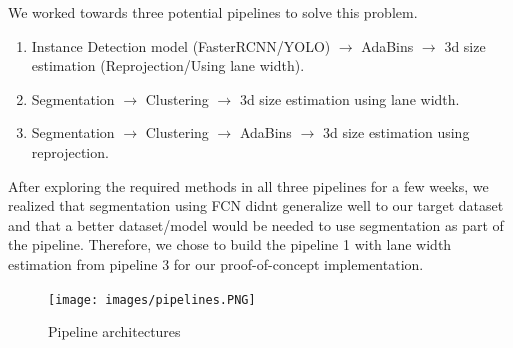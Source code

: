 \documentclass{article}
\begin{document}
We worked towards three potential pipelines to solve this problem.

\begin{enumerate}
    \item Instance Detection model (FasterRCNN/YOLO) $\to$ AdaBins $\to$ 3d size estimation (Reprojection/Using lane width).
    
    \item Segmentation $\to$ Clustering $\to$ 3d size estimation using lane width.
    
    \item Segmentation $\to$ Clustering $\to$ AdaBins $\to$ 3d size estimation using reprojection.
\end{enumerate}

After exploring the required methods in all three pipelines for a few weeks, we realized that segmentation using FCN didnt generalize well to our target dataset and that a better dataset/model would be needed to use segmentation as part of the pipeline. Therefore, we chose to build the pipeline 1 with lane width estimation from pipeline 3 for our proof-of-concept implementation.

\begin{figure}[ht]
\begin{center}
\texttt{[image: images/pipelines.PNG]}
\end{center}
\caption{Pipeline architectures}
\label{fig:pipeline1}
\end{figure}
\end{document}
